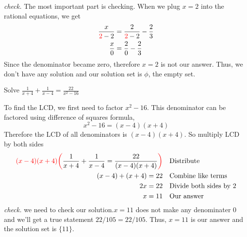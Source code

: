 \textit{check.} The most important part is checking. When we plug $x=2$ into the rational equations, we get
\begin{align*}
    \frac{x}{\textcolor{red}{2}-2}&=\frac{2}{\textcolor{red}{2}-2}-\frac{2}{3}\\
     \frac{x}{0}&=\frac{2}{0}-\frac{2}{3}   
\end{align*}
Since the denominator became zero, therefore $x=2$ is not our answer. Thus, we don't have any solution and our solution set is $\phi$, the empty set.
\begin{exa}
    Solve $\displaystyle \frac{1}{x+4}+\frac{1}{x-4}=\frac{22}{x^2-16}$
\end{exa}
To find the LCD, we first need to factor $x^2-16$. This denominator can be factored using difference of squares formula, 
\begin{equation*}
    x^2-16 = (x-4)(x+4)
\end{equation*}
Therefore the LCD of all denominators is $(x-4)(x+4)$. So multiply LCD by both sides
\begin{align*}
    \textcolor{red}{(x-4)(x+4)\biggl(}\frac{1}{x+4}+\frac{1}{x-4}=\frac{22}{(x-4)(x+4)}\textcolor{red}{\biggr)}&  &&\text{Distribute}\\
    (x-4)+(x+4) = 22&   &&\text{Combine like terms}\\
    2x = 22&    &&\text{Divide both sides by 2}\\
    x  = 11& &&\text{Our answer}
\end{align*}
\textit{check.} we need to check our solution.$x=11$ does not make any denominater 0 and we'll get a true statement $22/{105} = {22}/{105}$. Thus, $x=11$ is our answer and the solution set is $\{11\}$.
